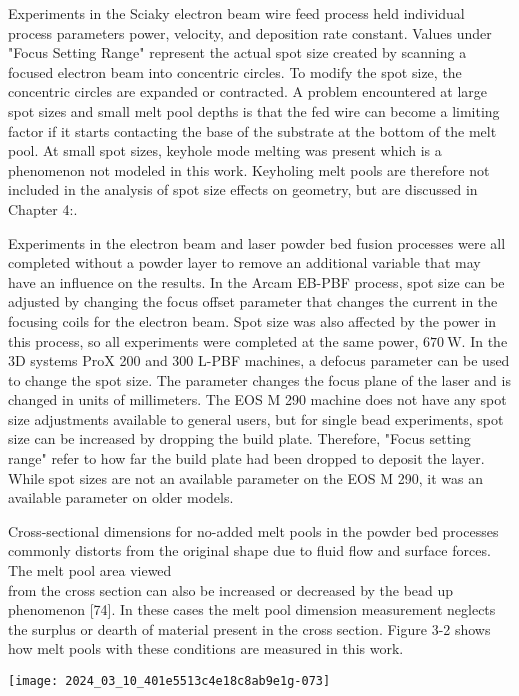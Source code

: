 \documentclass[10pt]{article}
\begin{document}
Experiments in the Sciaky electron beam wire feed process held individual process parameters power, velocity, and deposition rate constant. Values under "Focus Setting Range" represent the actual spot size created by scanning a focused electron beam into concentric circles. To modify the spot size, the concentric circles are expanded or contracted. A problem encountered at large spot sizes and small melt pool depths is that the fed wire can become a limiting factor if it starts contacting the base of the substrate at the bottom of the melt pool. At small spot sizes, keyhole mode melting was present which is a phenomenon not modeled in this work. Keyholing melt pools are therefore not included in the analysis of spot size effects on geometry, but are discussed in Chapter 4:.

Experiments in the electron beam and laser powder bed fusion processes were all completed without a powder layer to remove an additional variable that may have an influence on the results. In the Arcam EB-PBF process, spot size can be adjusted by changing the focus offset parameter that changes the current in the focusing coils for the electron beam. Spot size was also affected by the power in this process, so all experiments were completed at the same power, $670 \mathrm{~W}$. In the 3D systems ProX 200 and 300 L-PBF machines, a defocus parameter can be used to change the spot size. The parameter changes the focus plane of the laser and is changed in units of millimeters. The EOS M 290 machine does not have any spot size adjustments available to general users, but for single bead experiments, spot size can be increased by dropping the build plate. Therefore, "Focus setting range" refer to how far the build plate had been dropped to deposit the layer. While spot sizes are not an available parameter on the EOS M 290, it was an available parameter on older models.

Cross-sectional dimensions for no-added melt pools in the powder bed processes commonly distorts from the original shape due to fluid flow and surface forces. The melt pool area viewed\\
from the cross section can also be increased or decreased by the bead up phenomenon [74]. In these cases the melt pool dimension measurement neglects the surplus or dearth of material present in the cross section. Figure 3-2 shows how melt pools with these conditions are measured in this work.

\begin{center}
\texttt{[image: 2024\_03\_10\_401e5513c4e18c8ab9e1g-073]}
\end{center}
\end{document}
